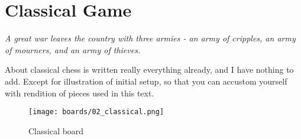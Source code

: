 

\chapter*{Classical Game}

\begin{flushright}
\parbox{0.8\textwidth}{
\emph{A great war leaves the country with three armies -
an army of cripples, an army of mourners, and an army of thieves. \\
 } }
\end{flushright}

\noindent
About classical chess is written really everything already, and I
have nothing to add. Except for illustration of initial setup, so that
you can accustom yourself with rendition of pieces used in this text.

\noindent
\begin{figure}[t]
\texttt{[image: boards/02\_classical.png]}
\caption{Classical board}
\label{fig:02_classical}
\end{figure}

\clearpage %
